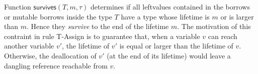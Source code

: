 Function $\mathsf{survives}(T,m,\tau)$ determines if all leftvalues contained
in the borrows or mutable borrows inside the type $T$ have a type whose lifetime is $m$ or
is larger than $m$. Hence they \emph{survive} to the end of the lifetime $m$.
The motivation of this contraint in rule
\textsf{T-Assign} is to guarantee that, when a variable $v$ can reach another variable $v'$,
the lifetime of $v'$ is equal or larger than the lifetime of $v$. Otherwise, the deallocation of
$v'$ (at the end of its lifetime) would leave a dangling reference reachable from $v$.
